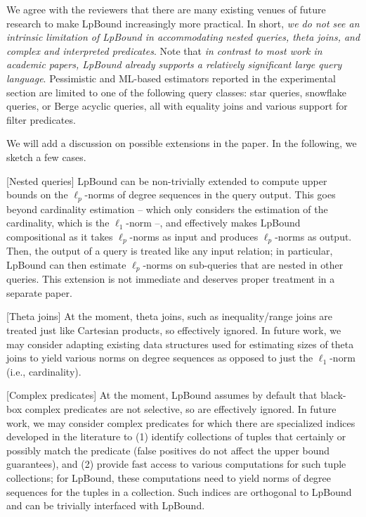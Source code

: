 {
\color{blue}
We agree with the reviewers that there are many existing venues of future research to make LpBound increasingly more practical. In short, {\em we do not see an intrinsic limitation of LpBound in accommodating nested queries, theta joins, and complex and interpreted  predicates}. Note that {\em in contrast to most work in academic papers, LpBound already supports a relatively significant large query language}. Pessimistic and ML-based estimators reported in the experimental section are limited to one of the following query classes: star queries, snowflake queries, or Berge acyclic queries, all with equality joins and various support for filter predicates.


We will add a discussion on possible extensions in the paper. In the following, we sketch a few cases.

[Nested queries] LpBound can be non-trivially extended to compute upper bounds on the $\ell_p$-norms of degree sequences in the query output. This goes beyond cardinality estimation -- which only considers the estimation of the cardinality, which is the $\ell_1$-norm --, and effectively makes LpBound compositional as it takes $\ell_p$-norms as input and produces $\ell_p$-norms as output. Then, the output of a query is treated like any input relation; in particular, LpBound can then estimate $\ell_p$-norms on sub-queries that are nested in other queries. This extension is not immediate and deserves proper treatment in a separate paper.

[Theta joins] At the moment, theta joins, such as inequality/range joins are treated just like Cartesian products, so effectively ignored. In future work, we may consider adapting existing data structures used for estimating sizes of theta joins to yield various norms on degree sequences as opposed to just the $\ell_1$-norm (i.e., cardinality).

[Complex predicates] At the moment, LpBound assumes by default that black-box complex predicates are not selective, so are effectively ignored. In future work, we may consider complex predicates for which there are specialized indices developed in the literature to (1) identify collections of tuples that certainly or possibly match the predicate (false positives do not affect the upper bound guarantees), and (2) provide fast access to various computations for such tuple collections; for LpBound, these computations need to yield norms of degree sequences for the tuples in a collection. Such indices are orthogonal to LpBound and can be trivially interfaced with LpBound.

}
